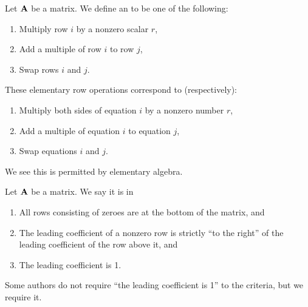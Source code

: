 \begin{definition}
Let $\mathbf{A}$ be a matrix. We define an 
to be one of the following:
\begin{enumerate}
\item Multiply row $i$ by a nonzero scalar $r$,
\item Add a multiple of row $i$ to row $j$,
\item Swap rows $i$ and $j$.
\end{enumerate}
\end{definition}

\begin{remark}
These elementary row operations correspond to (respectively):
\begin{enumerate}
\item Multiply both sides of equation $i$ by a nonzero number $r$,
\item Add a multiple of equation $i$ to equation $j$,
\item Swap equations $i$ and $j$.
\end{enumerate}
We see this is permitted by elementary algebra.
\end{remark}

\begin{definition}
Let $\mathbf{A}$ be a matrix. We say it is in 
\begin{enumerate}
\item All rows consisting of zeroes are at the bottom of the matrix, and
\item The leading coefficient of a nonzero row is strictly ``to the
  right'' of the leading coefficient of the row above it, and
\item The leading coefficient is 1.
\end{enumerate}
\end{definition}

\begin{remark}
Some authors do not require ``the leading coefficient is 1'' to the
criteria, but we require it.
\end{remark}

